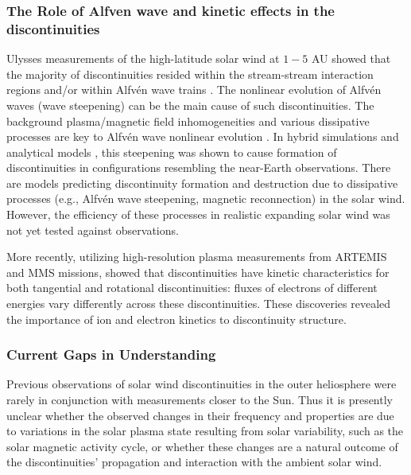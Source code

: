 \documentclass[
  letterpaper,
  DIV=11,
  numbers=noendperiod]{scrartcl}
\begin{document}
\subsubsection{The Role of Alfven wave and kinetic effects in the discontinuities}\label{the-role-of-alfven-wave-and-kinetic-effects-in-the-discontinuities}

Ulysses measurements of the high-latitude solar wind at \(1-5\) AU showed that the majority of discontinuities resided within the stream-stream interaction regions and/or within Alfvén wave trains \citep{tsurutaniInterplanetaryDiscontinuitiesAlfven1995, tsurutaniReviewDiscontinuitiesAlfven1999}. The nonlinear evolution of Alfvén waves (wave steepening) can be the main cause of such discontinuities. The background plasma/magnetic field inhomogeneities and various dissipative processes are key to Alfvén wave nonlinear evolution \citep{Lerche75, Prakash&Diamond99, Medvedev97:prl, Nariyuki14, Yang15}. In hybrid simulations \citep[see][]{Vasquez&Hollweg98, Vasquez&Hollweg01, TenBarge&Howes13} and analytical models \citep[e.g.,][]{Kennel88:jetp, Hada89, Malkov91, Wu&Kennel92, Medvedev97:pop}, this steepening was shown to cause formation of discontinuities in configurations resembling the near-Earth observations. There are models predicting discontinuity formation \citep{Servidio15, Podesta&Roytershteyn17} and destruction \citep{Servidio11,Matthaeus15} due to dissipative processes (e.g., Alfvén wave steepening, magnetic reconnection) in the solar wind. However, the efficiency of these processes in realistic expanding solar wind was not yet tested against observations.

More recently, utilizing high-resolution plasma measurements from ARTEMIS and MMS missions, \citet{artemyevKineticNatureSolar2019} showed that discontinuities have kinetic characteristics for both tangential and rotational discontinuities: fluxes of electrons of different energies vary differently across these discontinuities. These discoveries revealed the importance of ion and electron kinetics to discontinuity structure.

\subsubsection{Current Gaps in Understanding}\label{current-gaps-in-understanding}

Previous observations of solar wind discontinuities in the outer heliosphere were rarely in conjunction with measurements closer to the Sun. Thus it is presently unclear whether the observed changes in their frequency and properties are due to variations in the solar plasma state resulting from solar variability, such as the solar magnetic activity cycle, or whether these changes are a natural outcome of the discontinuities' propagation and interaction with the ambient solar wind.
\end{document}
